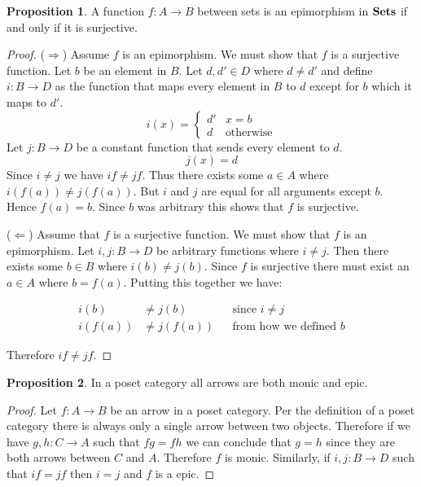 \documentclass{book}
\theoremstyle{definition}
\newtheorem{proposition}{Proposition}
\newcommand{\arr}[3]{#1 : #2 \rightarrow #3}
\begin{document}
\begin{proposition}
  A function $f : A \to B$ between sets is an epimorphism in $\bf{Sets}$ if and
  only if it is surjective.
\end{proposition}
\begin{proof}
  ($\Rightarrow$) Assume $f$ is an epimorphism. We must show that $f$ is a surjective
  function. Let $b$ be an element in $B$. Let $d, d' \in D$ where $d \neq d'$ and
  define $i : B \to D$ as the function that maps every element in $B$ to $d$
  except for $b$ which it maps to $d'$.
  \[
    i(x) = \begin{cases}
      d' & x = b \\
      d & \text{otherwise}
    \end{cases}
  \]
  Let $j : B \to D$ be a constant function that sends every element to $d$.
  \[
    j(x) = d
  \]
  Since $i \neq j$ we have $if \neq jf$. Thus there exists some $a \in A$ where
  $i(f(a)) \neq j(f(a))$. But $i$ and $j$ are equal for all arguments except
  $b$. Hence $f(a) = b$. Since $b$ was arbitrary this shows that $f$ is
  surjective.

  ($\Leftarrow$) Assume that $f$ is a surjective function. We must show that $f$ is an
  epimorphism. Let $i, j : B \to D$ be arbitrary functions where $i \neq j$. Then
  there exists some $b \in B$ where $i(b) \neq j(b)$. Since $f$ is surjective there
  must exist an $a \in A$ where $b = f(a)$. Putting this together we have:

  \begin{align*}
    i(b) &\neq j(b) && \text{since $i \neq j$} \\
    i(f(a)) &\neq j(f(a)) && \text{from how we defined $b$}
  \end{align*}

  Therefore $if \neq jf$.
\end{proof}

\begin{proposition}
  In a poset category all arrows are both monic and epic.
\end{proposition}
\begin{proof}
  Let $f : A \to B$ be an arrow in a poset category. Per the definition of a
  poset category there is always only a single arrow between two objects.
  Therefore if we have $g, h : C \to A$ such that $fg = fh$ we can conclude
  that $g = h$ since they are both arrows between $C$ and $A$. Therefore $f$ is
  monic. Similarly, if $\arr{i, j}{B}{D}$ such that $if = jf$ then $i = j$ and
  $f$ is a epic.
\end{proof}
\end{document}
